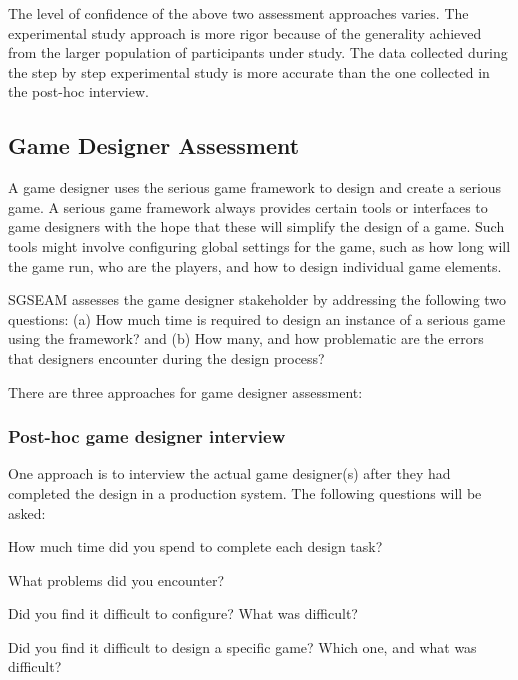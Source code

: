 \documentclass[11pt]{article}
\begin{document}
The level of confidence of the above two assessment approaches varies. The experimental study
approach is more rigor because of the generality achieved from the larger population of
participants under study. The data collected during the step by step experimental study is more
accurate than the one collected in the post-hoc interview.

\subsection{Game Designer Assessment}

A game designer uses the serious game framework to design and create a serious game.
A serious game framework always provides certain tools or interfaces to game designers
with the hope that these will simplify the design of a game. Such tools might involve
configuring global settings for the game, such as how long will the game run, who are the
players, and how to design individual game elements.

SGSEAM assesses the game designer stakeholder by addressing the following two questions: (a) How
much time is required to design an instance of a serious game using the framework? and (b) How
many, and how problematic are the errors that designers encounter during the design process?

There are three approaches for game designer assessment:

\subsubsection{Post-hoc game designer interview}
\label{Post-hoc game designer interview}

One approach is to interview the actual game designer(s) after they had completed the design in a production system. The following questions will be asked:\\
 
\begin{compactitem}
\item How much time did you spend to complete each design task?
\item What problems did you encounter?
\item Did you find it difficult to configure? What was difficult?
\item Did you find it difficult to design a specific game? Which one, and what was difficult?\\
\end{compactitem}
\end{document}
